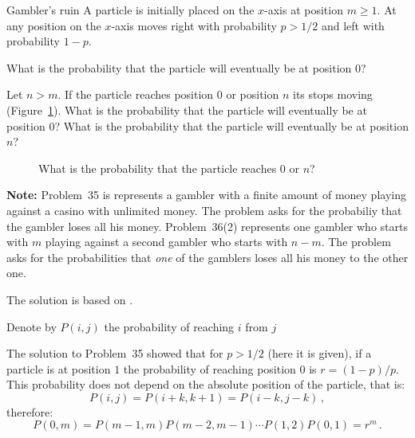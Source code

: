 \begin{prob}{Gambler's ruin}
A particle is initially placed on the $x$-axis at position $m\geq 1$. At any position on the $x$-axis moves right with probability $p>1/2$ and left with probability $1-p$.

 What is the probability that the particle will eventually be at position $0$?

 Let $n>m$. If the particle reaches position $0$ or position $n$ its stops moving (Figure~\ref{f.ruin3}). What is the probability that the particle will eventually be at position $0$? What is the probability that the particle will eventually be at position $n$?
\begin{figure}[tb]
\begin{center}
\end{center}
\caption{What is the probability that the particle reaches $0$ or $n$?}\label{f.ruin3}
\end{figure}

\textbf{Note:} Problem~35 is represents a gambler with a finite amount of money playing against a casino with unlimited money. The problem asks for the probabiliy that the gambler loses all his money. Problem~36(2) represents one gambler who starts with $m$ playing against a second gambler who starts with $n-m$. The problem asks for the probabilities that \emph{one} of the gamblers loses all his money to the other one.
\end{prob}

\solution{}

The solution is based on \cite[Chapter~3, Example~4m]{ross}.

Denote by $P(i,j)$ the probability of reaching $i$ from $j$

 The solution to Problem~35 showed that for $p>1/2$ (here it is given), if a particle is at position $1$ the probability of reaching position $0$ is $r=(1-p)/p$. This probability does not depend on the absolute position of the particle, that is:
\[
P(i,j) = P(i+k,k+1) = P(i-k,j-k)\,,
\]
therefore:
\begin{equation}
P(0,m)=P(m-1,m)P(m-2,m-1)\cdots P(1,2)P(0,1)=r^m\,.
\end{equation}

